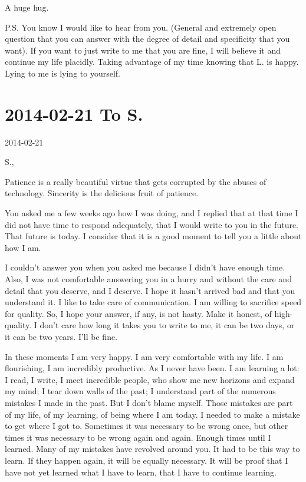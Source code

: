 \documentclass[]{book}
\begin{document}
A huge hug.

P.S. You know I would like to hear from you. (General and extremely open question that you can answer with the degree of detail and specificity that you want). If you want to just write to me that you are fine, I will believe it and continue my life placidly. Taking advantage of my time knowing that L. is happy. Lying to me is lying to yourself.

\hypertarget{tos20140221}{%
\section*{2014-02-21 To S.}\label{tos20140221}}

2014-02-21

S.,

Patience is a really beautiful virtue that gets corrupted by the abuses of technology. Sincerity is the delicious fruit of patience.

You asked me a few weeks ago how I was doing, and I replied that at that time I did not have time to respond adequately, that I would write to you in the future. That future is today. I consider that it is a good moment to tell you a little about how I am.

I couldn't answer you when you asked me because I didn't have enough time. Also, I was not comfortable answering you in a hurry and without the care and detail that you deserve, and I deserve. I hope it hasn't arrived bad and that you understand it. I like to take care of communication. I am willing to sacrifice speed for quality. So, I hope your answer, if any, is not hasty. Make it honest, of high-quality. I don't care how long it takes you to write to me, it can be two days, or it can be two years. I'll be fine.

In these moments I am very happy. I am very comfortable with my life. I am flourishing, I am incredibly productive. As I never have been. I am learning a lot: I read, I write, I meet incredible people, who show me new horizons and expand my mind; I tear down walls of the past; I understand part of the numerous mistakes I made in the past. But I don't blame myself. Those mistakes are part of my life, of my learning, of being where I am today. I needed to make a mistake to get where I got to. Sometimes it was necessary to be wrong once, but other times it was necessary to be wrong again and again. Enough times until I learned. Many of my mistakes have revolved around you. It had to be this way to learn. If they happen again, it will be equally necessary. It will be proof that I have not yet learned what I have to learn, that I have to continue learning.
\end{document}
